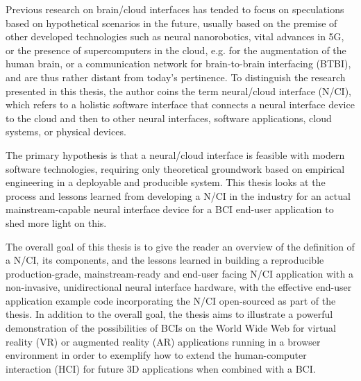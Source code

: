 Previous research on brain/cloud interfaces has tended to focus on speculations based on hypothetical scenarios in the future, usually based on the premise of other developed technologies such as neural nanorobotics, vital advances in 5G, or the presence of supercomputers in the cloud, e.g. for the augmentation of the human brain, or a communication network for brain-to-brain interfacing (BTBI), and are thus rather distant from today's pertinence. To distinguish the research presented in this thesis, the author coins the term neural/cloud interface (N/CI), which refers to a holistic software interface that connects a neural interface device to the cloud and then to other neural interfaces, software applications, cloud systems, or physical devices.

The primary hypothesis is that a neural/cloud interface is feasible with modern software technologies, requiring only theoretical groundwork based on empirical engineering in a deployable and producible system. This thesis looks at the process and lessons learned from developing a N/CI in the industry for an actual mainstream-capable neural interface device for a BCI end-user application to shed more light on this.

The overall goal of this thesis is to give the reader an overview of the definition of a N/CI, its components, and the lessons learned in building a reproducible production-grade, mainstream-ready and end-user facing N/CI application with a non-invasive, unidirectional neural interface hardware, with the effective end-user application example code incorporating the N/CI open-sourced as part of the thesis. In addition to the overall goal, the thesis aims to illustrate a powerful demonstration of the possibilities of BCIs on the World Wide Web for virtual reality (VR) or augmented reality (AR) applications running in a browser environment in order to exemplify how to extend the human-computer interaction (HCI) for future 3D applications when combined with a BCI.

